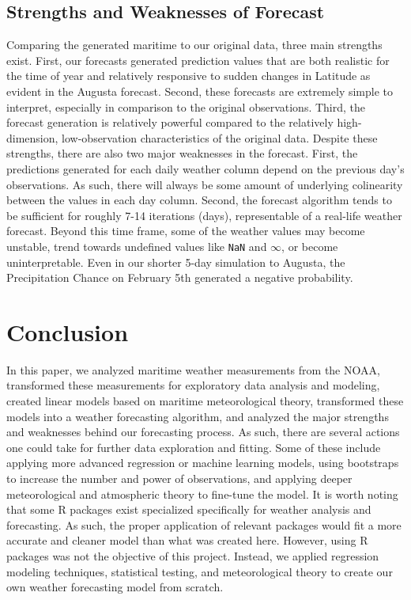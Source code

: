 \documentclass{article}
\begin{document}
\subsection{Strengths and Weaknesses of Forecast}

Comparing the generated maritime to our original data, three main strengths exist. First, our forecasts generated prediction values that are both realistic for the time of year and relatively responsive to sudden changes in Latitude as evident in the Augusta forecast. Second, these forecasts are extremely simple to interpret, especially in comparison to the original observations. Third, the forecast generation is relatively powerful compared to the relatively high-dimension, low-observation characteristics of the original data. Despite these strengths, there are also two major weaknesses in the forecast. First, the predictions generated for each daily weather column depend on the previous day's observations. As such, there will always be some amount of underlying colinearity between the values in each day column. Second, the forecast algorithm tends to be sufficient for roughly 7-14 iterations (days), representable of a real-life weather forecast. Beyond this time frame, some of the weather values may become unstable, trend towards undefined values like \texttt{NaN} and $\infty$, or become uninterpretable. Even in our shorter 5-day simulation to Augusta, the Precipitation Chance on February 5th generated a negative probability.

\section{Conclusion}

In this paper, we analyzed maritime weather measurements from the NOAA, transformed these measurements for exploratory data analysis and modeling, created linear models based on maritime meteorological theory, transformed these models into a weather forecasting algorithm, and analyzed the major strengths and weaknesses behind our forecasting process. As such, there are several actions one could take for further data exploration and fitting. Some of these include applying more advanced regression or machine learning models, using bootstraps to increase the number and power of observations, and applying deeper meteorological and atmospheric theory to fine-tune the model. It is worth noting that some R packages exist specialized specifically for weather analysis and forecasting. As such, the proper application of relevant packages would fit a more accurate and cleaner model than what was created here. However, using R packages was not the objective of this project. Instead, we applied regression modeling techniques, statistical testing, and meteorological theory to create our own weather forecasting model from scratch.

\newpage




\end{document}
